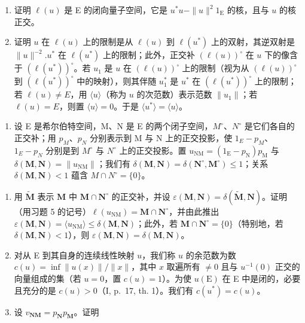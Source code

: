 \begin{enumerate}
\begin{enumerate}
\def\labelenumi{\alph{enumi})}
\item
  证明 \(\ell(u)\) 是 E 的闭向量子空间，它是 \(u^{*}u - \| u\|^{2}1_{\mathrm{E}}\) 的核，且与 \(u\) 的核正交。
\item
  证明 \(u\) 在 \(\ell(u)\) 上的限制是从 \(\ell(u)\) 到 \(\ell(u^*)\) 上的双射，其逆双射是 \(\|u\|^{-2}.u^*\) 在 \(\ell(u^*)\) 上的限制；此外，正交补 \((\ell(u))^{\circ}\) 在 \(u\) 下的像含于 \((\ell(u^*))^{\circ}\)。若 \(u_1\) 是 \(u\) 在 \((\ell(u))^{\circ}\) 上的限制（视为从 \((\ell(u))^{\circ}\) 到 \((\ell(u^*))^{\circ}\) 中的映射），则其伴随 \(u_1^*\) 是 \(u^*\) 在 \((\ell(u^*))^{\circ}\) 上的限制；若 \(\ell(u) \neq E\)，用 \(\langle u\rangle\)（称为 \(u\) 的次范数）表示范数 \(\|u_1\|\)；若 \(\ell(u) = E\)，则置 \(\langle u\rangle = 0\)。于是 \(\langle u^*\rangle = \langle u\rangle\)。
\end{enumerate}

\begin{enumerate}
\def\labelenumi{\arabic{enumi})}
\setcounter{enumi}{5}
\tightlist
\item
  设 E 是希尔伯特空间，M、N 是 E 的两个闭子空间，\(M^{\circ}\)、\(N^{\circ}\) 是它们各自的正交补；用 \(p_{M}\)、\(p_{N}\) 分别表示到 M 与 N 上的正交投影，使 \(1_{E} - p_{M}\)、\(1_{E} - p_{N}\) 分别是到 \(M^{\circ}\) 与 \(N^{\circ}\) 上的正交投影。置 \(u_{\mathrm{NM}} = (1_{\mathrm{E}} - p_{\mathrm{N}}) p_{\mathrm{M}}\) 与 \(\delta(\mathbf{M}, \mathbf{N}) = \|u_{\mathrm{NM}}\|\)；我们有 \(\delta(\mathbf{M}, \mathbf{N}) = \delta(\mathbf{N}^{\circ}, \mathbf{M}^{\circ}) \leqslant 1\)；关系 \(\delta(\mathbf{M}, \mathbf{N}) < 1\) 蕴含 \(M \cap N^{\circ} = \{0\}\)。
\end{enumerate}

\begin{enumerate}
\def\labelenumi{\alph{enumi})}
\item
  用 \(\tilde{\mathbf{M}}\) 表示 \(\mathbf{M}\) 中 \(\mathbf{M} \cap \mathbf{N}^{\circ}\) 的正交补，并设 \(\varepsilon(\mathbf{M}, \mathbf{N}) = \delta(\tilde{\mathbf{M}}, \mathbf{N})\)。证明（用习题 5 的记号）\(\ell(u_{\mathrm{NM}}) = \mathbf{M} \cap \mathbf{N}^{\circ}\)，并由此推出 \(\varepsilon(\mathbf{M}, \mathbf{N}) = \langle u_{\mathrm{NM}} \rangle \leqslant \delta(\mathbf{M}, \mathbf{N})\)；此外，若 \(\mathbf{M} \cap \mathbf{N}^{\circ} = \{0\}\)（特别地，若 \(\delta(\mathbf{M}, \mathbf{N}) < 1\)），则 \(\varepsilon(\mathbf{M}, \mathbf{N}) = \delta(\mathbf{M}, \mathbf{N})\)。
\item
  对从 E 到其自身的连续线性映射 \(u\)，我们称 \(u\) 的余范数为数 \(c(u) = \inf \|u(x)\|/\|x\|\)，其中 \(x\) 取遍所有 \(\neq 0\) 且与 \(u^{-1}(0)\) 正交的向量组成的集（若 \(u = 0\)，置 \(c(u) = 1\)）。为使 \(u(\mathrm{E})\) 在 E 中是闭的，必要且充分的是 \(c(u) > 0\)（I, p.~17, th. 1）。我们有 \(c(u^{*}) = c(u)\)。
\item
  设 \(v_{\mathbf{NM}} = p_{\mathbf{N}}p_{\mathbf{M}}\)。证明
\end{enumerate}


\end{enumerate}
